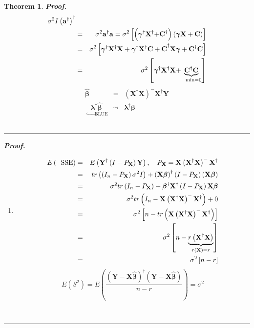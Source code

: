 \documentclass{article}
\newtheorem{theorem}{Theorem}
\newenvironment{proof}[1][Proof]{\noindent\textbf{#1.} }{\ \rule{0.5em}{0.5em}}
\begin{document}
\begin{theorem}
\begin{proof}
\begin{eqnarray*}
{}\sigma ^{2}I\left( \mathbf{a}^{\dagger }\right) ^{\dagger } \\
&=&\sigma ^{2}\mathbf{a}^{\dagger }\mathbf{a}=\sigma ^{2}\left[ \left( 
\mathbf{\gamma }^{\dagger }\mathbf{X}^{\dagger }\mathbf{+C}^{\dagger
}\right) \left( \mathbf{\gamma X+C}\right) \right] \\
&=&\sigma ^{2}\left[ \mathbf{\gamma }^{\dagger }\mathbf{X}^{\dagger }\mathbf{%
X+\mathbf{\gamma }^{\dagger }\mathbf{X}^{\dagger }C+C}^{\dagger }\mathbf{%
X\gamma +C}^{\dagger }\mathbf{C}\right] \\
&=&\sigma ^{2}\left[ \mathbf{\gamma }^{\dagger }\mathbf{X}^{\dagger }\mathbf{%
X+}\underset{\text{min=0}}{\underbrace{\mathbf{C}^{\dagger }\mathbf{C}}}%
\right]
\end{eqnarray*}%
\begin{eqnarray*}
\mathbf{\hat{\beta}} &=&\left( \mathbf{X}^{\dagger }\mathbf{X}\right) ^{-}%
\mathbf{X}^{\dagger }\mathbf{Y} \\
\underset{\quad \hookrightarrow \text{BLUE}}{\mathbf{\lambda }^{\dagger }%
\mathbf{\hat{\beta}}} &\mathbf{\leadsto }&\mathbf{\lambda }^{\dagger }%
\mathbf{\beta }
\end{eqnarray*}
\end{proof}

\begin{proof}

\begin{enumerate}
\item 
\begin{eqnarray*}
E\left( \text{SSE}\right)  &=&E\left( \mathbf{Y}^{\dagger }\left( I-P_{%
\mathbf{X}}\right) \mathbf{Y}\right) ,\quad P_{\mathbf{X}}=\mathbf{X}\left( 
\mathbf{X}^{\dagger }\mathbf{X}\right) ^{-}\mathbf{X}^{\dagger } \\
&=&tr\left( \left( I_{n}-P_{\mathbf{X}}\right) \sigma ^{2}I\right) +\left( 
\mathbf{X\beta }\right) ^{\dagger }\left( I-P_{\mathbf{X}}\right) \left( 
\mathbf{X\beta }\right)  \\
&=&\sigma ^{2}tr\left( I_{n}-P_{\mathbf{X}}\right) +\mathbf{\beta }^{\dagger
}\mathbf{X}^{\dagger }\left( I-P_{\mathbf{X}}\right) \mathbf{X\beta } \\
&=&\sigma ^{2}tr\left( I_{n}-\mathbf{X}\left( \mathbf{X}^{\dagger }\mathbf{X}%
\right) ^{-}\mathbf{X}^{\dagger }\right) +0 \\
&=&\sigma ^{2}\left[ n-tr\left( \mathbf{X}\left( \mathbf{X}^{\dagger }%
\mathbf{X}\right) ^{-}\mathbf{X}^{\dagger }\right) \right]  \\
&=&\sigma ^{2}\left[ n-\underset{r\left( \mathbf{X}\right) =r}{\underbrace{%
r\left( \mathbf{X}^{\dagger }\mathbf{X}\right) }}\right]  \\
&=&\sigma ^{2}\left[ n-r\right] 
\end{eqnarray*}%
\begin{equation*}
E\left( S^{2}\right) =E\left( \frac{\left( \mathbf{Y}-\mathbf{X\hat{\beta}}%
\right) ^{\dagger }\left( \mathbf{Y}-\mathbf{X\hat{\beta}}\right) }{n-r}%
\right) =\sigma ^{2}
\end{equation*}


\end{enumerate}
\end{proof}
\end{theorem}
\end{document}
